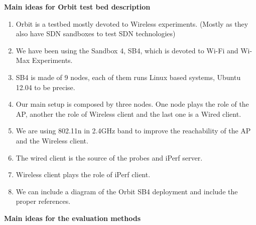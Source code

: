 \textbf{Main ideas for Orbit test bed description}

\begin{enumerate}
	\item Orbit is a testbed mostly devoted to Wireless experiments. (Mostly as they also have SDN sandboxes to test SDN technologies)
	\item We have been using the Sandbox 4, SB4, which is devoted to Wi-Fi and Wi-Max Experiments.
	\item SB4 is made of 9 nodes, each of them runs Linux based systems, Ubuntu 12.04 to be precise.
	\item Our main setup is composed by three nodes. One node plays the role of the AP, another the role of Wireless client and the last one is a Wired client.
	\item We are using 802.11n in 2.4GHz band to improve the reachability of the AP and the Wireless client.
	\item The wired client is the source of the probes and iPerf server.
	\item Wireless client plays the role of iPerf client.
	\item We can include a diagram of the Orbit SB4 deployment and include the proper references.
\end{enumerate}

\textbf{Main ideas for the evaluation methods}

